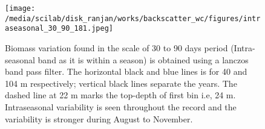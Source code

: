 \documentclass{article}
\begin{document}
\begin{figure}[htbp]
	\centering
	\texttt{[image: /media/scilab/disk\_ranjan/works/backscatter\_wc/figures/intraseasonal\_30\_90\_181.jpeg]} 
	\captionsetup{justification=justified,font=footnotesize,skip=0.05\baselineskip,width=\textwidth}
	\caption{Biomass variation found in the scale of 30 to 90 days  period (Intra-seasonal band as it is within a season) is obtained using a lanczos band pass filter. The horizontal black and blue lines is for 40 and 104 m respectively; vertical black lines separate the years. The dashed line at 22 m marks the top-depth of first bin i.e, 24 m.  Intraseasonal variability is seen throughout the record and the variability is stronger during August to November.}
	\label{fig:intraseasonal}
\end{figure}
\end{document}
